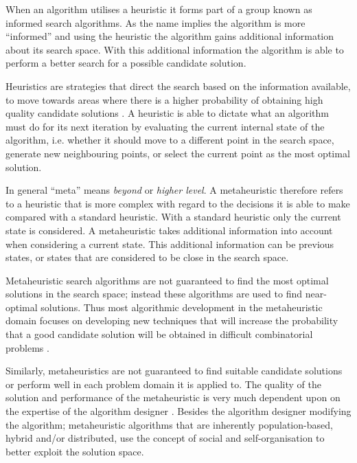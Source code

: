 When an algorithm utilises a heuristic it forms part of a group known as informed search algorithms. As the name implies the algorithm is more ``informed'' and using the heuristic the algorithm gains additional information about its search space. With this additional information the algorithm is able to perform a better search for a possible candidate solution\cite{AIModernApproach}.

Heuristics are strategies that direct the search based on the information available, to move towards areas where there is a higher probability of obtaining high quality candidate solutions \cite{AIModernApproach}. A heuristic is able to dictate what an algorithm must do for its next iteration by evaluating the current internal state of the algorithm, i.e. whether it should move to a different point in the search space, generate new neighbouring points, or select the current point as the most optimal solution\cite{AIModernApproach,NatureInspiredMetaHeuristic}. 

In general ``meta'' means \emph{beyond} or \emph{higher level}\cite{AIModernApproach,NatureInspiredMetaHeuristic}. A metaheuristic therefore refers to a heuristic that is more complex with regard to the decisions it is able to make compared with a standard heuristic\cite{AIModernApproach,NatureInspiredMetaHeuristic}. With a standard heuristic only the current state is considered\cite{AIModernApproach}. A metaheuristic takes additional information into account when considering a current state\cite{NatureInspiredMetaHeuristic}. This additional information can be previous states, or states that are considered to be close in the search space\cite{AIModernApproach, NatureInspiredMetaHeuristic}.

Metaheuristic search algorithms are not guaranteed to find the most optimal solutions in the search space; instead these algorithms are used to find near-optimal solutions. Thus most algorithmic development in the metaheuristic domain focuses on developing new techniques that will increase the probability that a good candidate solution will be obtained in difficult combinatorial problems \cite{MetaAgricultural}.

Similarly, metaheuristics are not guaranteed to find suitable candidate solutions or perform well in each problem domain it is applied to. The quality of the solution and performance of the metaheuristic is very much dependent upon on the expertise of the algorithm designer \cite{AutoComplexMeta}. Besides the algorithm designer modifying the algorithm; metaheuristic algorithms that are inherently population-based, hybrid and/or distributed, use the concept of social and self-organisation to better exploit the solution space\cite{Self-AdaptiveMeta}.

